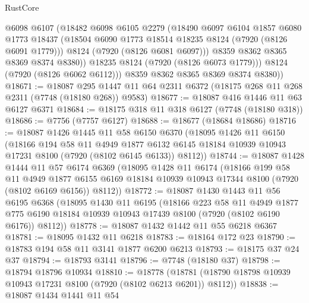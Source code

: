 \begin{lexlean}{RustCore}
\begin{coremodule}
              @6098
              @6107
              (@18482
                @6098
                @6105
                @2279
                (@18490
                  @6097
                  @6104
                  @1857
                  @6080
                  @1773
                  @18437
                  (@18504 @6090 @1773 @18514 @18235 @8124 (@7920 (@8126 @6091 @1779)))
                  @8124
                  (@7920 (@8126 @6081 @6097)))
                @8359
                @8362
                @8365
                @8369
                @8374
                @8380))
            @18235
            @8124
            (@7920 (@8126 @6073 @1779)))
          @8124
          (@7920 (@8126 @6062 @6112)))
        @8359
        @8362
        @8365
        @8369
        @8374
        @8380))
@18671 := @18087
    @295
    @1447
    @11
    @64
    @2311
    @6372
    (@18175 @268 @11 @268 @2311 (@7748 (@18180 @268)) @9583)
@18677 := @18087 @416 @1446 @11 @63 @6127 @6371
@18684 := @18175 @318 @11 @318 @6127 (@7748 (@18180 @318))
@18686 := @7756 (@7757 @6127)
@18688 := @18677 (@18684 @18686)
@18716 := @18087
    @1426
    @1445
    @11
    @58
    @6150
    @6370
    (@18095
      @1426
      @11
      @6150
      (@18166
        @194
        @58
        @11
        @4949
        @1877
        @6132
        @6145
        @18184
        @10939
        @10943
        @17231
        @8100
        (@7920 (@8102 @6145 @6133))
        @8112))
@18744 := @18087
    @1428
    @1444
    @11
    @57
    @6174
    @6369
    (@18095
      @1428
      @11
      @6174
      (@18166
        @199
        @58
        @11
        @4949
        @1877
        @6155
        @6169
        @18184
        @10939
        @10943
        @17344
        @8100
        (@7920 (@8102 @6169 @6156))
        @8112))
@18772 := @18087
    @1430
    @1443
    @11
    @56
    @6195
    @6368
    (@18095
      @1430
      @11
      @6195
      (@18166
        @223
        @58
        @11
        @4949
        @1877
        @775
        @6190
        @18184
        @10939
        @10943
        @17439
        @8100
        (@7920 (@8102 @6190 @6176))
        @8112))
@18778 := @18087 @1432 @1442 @11 @55 @6218 @6367
@18781 := @18095 @1432 @11 @6218
@18783 := @18164 @172 @23
@18790 := @18783 @194 @58 @11 @3141 @1877 @6200 @6213
@18793 := @18175 @37 @24 @37
@18794 := @18793 @3141
@18796 := @7748 (@18180 @37)
@18798 := @18794 @18796 @10934
@18810 := @18778
    (@18781 (@18790 @18798 @10939 @10943 @17231 @8100 (@7920 (@8102 @6213 @6201)) @8112))
@18838 := @18087
    @1434
    @1441
    @11
    @54

\end{coremodule}
\end{lexlean}

